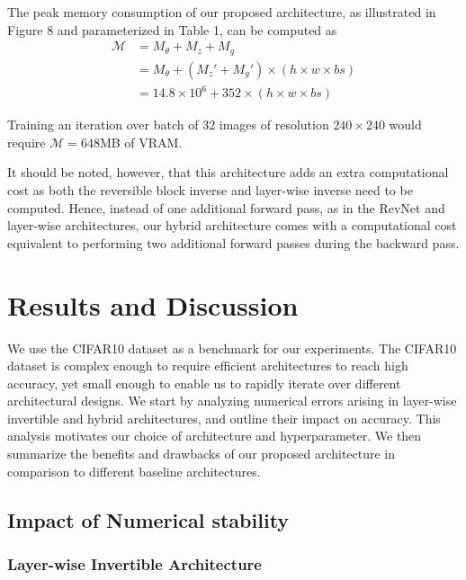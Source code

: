 \documentclass[twocolumn]{bmcart}
\begin{document}
The peak memory consumption of our proposed architecture, as illustrated in Figure 8 and parameterized in Table 1, can be computed as
\begin{subequations}
\begin{align}
\mathcal{M} &= M_{\theta} + M_{z} + M_{g} \\
            &= M_{\theta} + (M_z' + M_{g}') \times (h \times w \times bs) \\
            &= 14.8 \times 10^6 + 352 \times (h \times w \times bs)
\end{align}
\end{subequations}

Training an iteration over batch of 32 images of resolution $240 \times 240$ would require $\mathcal{M}=648$MB of VRAM.

It should be noted, however, that this architecture adds an extra computational cost as both the reversible block inverse and layer-wise inverse need to be computed.
Hence, instead of one additional forward pass, as in the RevNet and layer-wise architectures,
our hybrid architecture comes with a computational cost equivalent to performing two additional forward passes
during the backward pass.

\section{Results and Discussion}

We use the CIFAR10 dataset as a benchmark for our experiments.
The CIFAR10 dataset is complex enough to require efficient architectures to reach high accuracy,
yet small enough to enable us to rapidly iterate over different architectural designs.
We start by analyzing numerical errors arising in layer-wise invertible and hybrid architectures,
and outline their impact on accuracy.
This analysis motivates our choice of architecture and hyperparameter.
We then summarize the benefits and drawbacks of our proposed architecture in comparison to different baseline architectures.

\subsection{Impact of Numerical stability}

\subsubsection{Layer-wise Invertible Architecture}
\end{document}
